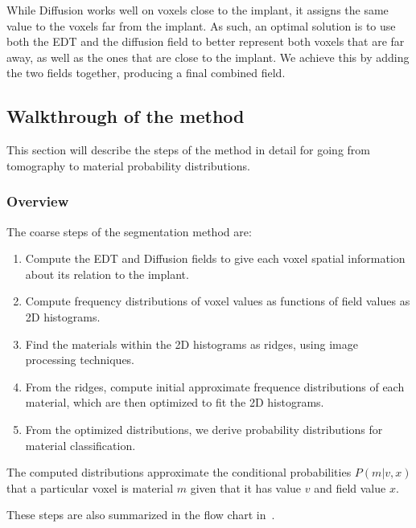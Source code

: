 While Diffusion works well on voxels close to the implant, it assigns the same value to the voxels far from the implant. 
As such, an optimal solution is to use both the EDT and the diffusion field to better represent both voxels that are far away, as well as the ones that are close to the implant.
We achieve this by adding the two fields together, producing a final combined field.


\subsection{Walkthrough of the method}
This section will describe the steps of the method in detail for going from tomography to material probability distributions.

\subsubsection{Overview}
The coarse steps of the segmentation method are:
\begin{enumerate}
    \item Compute the EDT and Diffusion fields to give each voxel spatial information about its relation to the implant.
    \item Compute frequency distributions of voxel values as functions of field values as 2D histograms.
    \item Find the materials within the 2D histograms as ridges, using image processing techniques.
    \item From the ridges, compute initial approximate frequence distributions of each material, which are then optimized to fit the 2D histograms. 
    \item From the optimized distributions, we derive probability distributions for material classification.
\end{enumerate}
The computed distributions approximate the conditional probabilities $P(m|v,x)$ that a particular voxel
is material $m$ given that it has value $v$ and field value $x$. 


These steps are also summarized in the flow chart in~.

